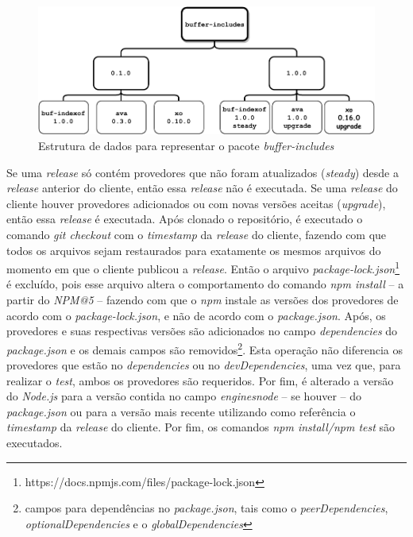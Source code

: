 \begin{figure}
    \centering
    \includegraphics[scale=0.9]{figuras/bcdetect_work.pdf}
    \caption{Estrutura de dados para representar o pacote \textit{buffer-includes}}
    \label{fig:bc_work}
\end{figure}{}

Se uma \textit{release} só contém provedores que não foram atualizados (\textit{steady}) desde a \textit{release} anterior do cliente, então essa \textit{release} não é executada. Se uma \textit{release} do cliente houver provedores adicionados ou com novas versões aceitas (\textit{upgrade}), então essa \textit{release} é executada. Após clonado o repositório, é executado o comando \textit{git checkout} com o \textit{timestamp} da \textit{release} do cliente, fazendo com que todos os arquivos sejam restaurados para exatamente os mesmos arquivos do momento em que o cliente publicou a \textit{release}. Então o arquivo \textit{package-lock.json}\footnote{https://docs.npmjs.com/files/package-lock.json} é excluído, pois esse arquivo altera o comportamento do comando \textit{npm install} -- a partir do \textit{NPM@5} -- fazendo com que o \textit{npm} instale as versões dos provedores de acordo com o \textit{package-lock.json}, e não de acordo com o \textit{package.json}. Após, os provedores e suas respectivas versões são adicionados no campo \textit{dependencies} do \textit{package.json} e os demais campos são removidos\footnote{campos para dependências no \textit{package.json}, tais como o \textit{peerDependencies}, \textit{optionalDependencies} e o \textit{globalDependencies}}. Esta operação não diferencia os provedores que estão no \textit{dependencies} ou no \textit{devDependencies}, uma vez que, para realizar o \textit{test}, ambos os provedores são requeridos. Por fim, é alterado a versão do \textit{Node.js} para a versão contida no campo \textit{engines\textrightarrow node} -- se houver -- do \textit{package.json} ou para a versão mais recente utilizando como referência o \textit{timestamp} da \textit{release} do cliente. Por fim, os comandos \textit{npm install/npm test} são executados.

